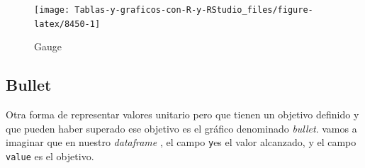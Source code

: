 \documentclass[
]{book}
\begin{document}
\begin{figure}[H]

{\centering \texttt{[image: Tablas-y-graficos-con-R-y-RStudio\_files/figure-latex/8450-1]} 

}

\caption{Gauge}\label{fig:8450}
\end{figure}

\hypertarget{bullet}{%
\subsection{Bullet}\label{bullet}}

Otra forma de representar valores unitario pero que tienen un objetivo definido y que pueden haber superado ese objetivo es el gráfico denominado \emph{bullet}. vamos a imaginar que en nuestro \emph{dataframe} , el campo \texttt{y}es el valor alcanzado, y el campo \texttt{value} es el objetivo.
\end{document}
